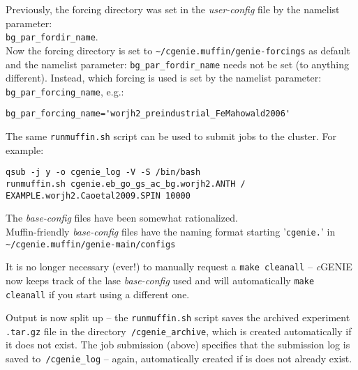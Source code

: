 \documentclass[10pt,twoside]{article}
\begin{document}
\begin{compactenum}
\item Previously, the forcing directory was set in the \textit{user-config} file by the namelist parameter:
\\ \texttt{bg\_par\_fordir\_name}.
\\ Now the forcing directory is set to \texttt{\~{}/cgenie.muffin/genie-forcings} as default and the namelist parameter: \texttt{bg\_par\_fordir\_name} needs not be set (to anything different).
Instead, which forcing is used is set by the namelist parameter: \texttt{bg\_par\_forcing\_name}, e.g.:
\vspace{-5pt}\begin{verbatim}
bg_par_forcing_name='worjh2_preindustrial_FeMahowald2006'
\end{verbatim}\vspace{-0pt}

\item The same \texttt{runmuffin.sh} script can be used to submit jobs to the cluster. For example:
\vspace{-5pt}\small\begin{verbatim}
qsub -j y -o cgenie_log -V -S /bin/bash
runmuffin.sh cgenie.eb_go_gs_ac_bg.worjh2.ANTH / EXAMPLE.worjh2.Caoetal2009.SPIN 10000
\end{verbatim}\normalsize\vspace{-5pt}
  
\item The \textit{base-config} files have been somewhat rationalized.
\\Muffin-friendly \textit{base-config} files have the naming format starting '\texttt{cgenie.}' in
\\ \texttt{\~{}/cgenie.muffin/genie-main/configs}

\item It is no longer necessary (ever!) to manually request a \texttt{make cleanall} -- \textit{c}GENIE now keeps track of the lase \textit{base-config} used and will automatically \texttt{make cleanall} if you start using a different one.

\item Output is now split up -- the \texttt{runmuffin.sh} script saves the archived experiment \texttt{.tar.gz} file in the directory\texttt{~/cgenie\_archive}, which is created automatically if it does not exist. The job submission (above) specifies that the submission log is saved to\texttt{~/cgenie\_log} -- again, automatically created if is does not already exist.

\end{compactenum}


\end{document}
